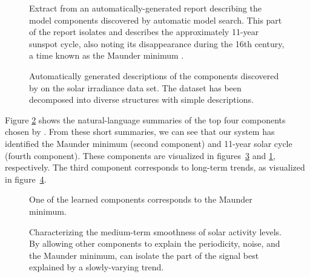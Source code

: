 \begin{figure}[h]
\centering
{}
\caption[Extract from an automatically-generated report]
{Extract from an automatically-generated report describing the model components discovered by automatic model search.  This part of the report isolates and describes the approximately 11-year sunspot cycle, also noting its disappearance during the 16th century, a time known as the Maunder minimum \citep{lean1995reconstruction}.}
\label{fig:periodic}
\end{figure}

\begin{figure}[h]
\centering
{}
\caption[Automatically-generated descriptions of the solar irradiance data set]
{Automatically generated descriptions of the components discovered by \procedurename{} on the solar irradiance data set.
The dataset has been decomposed into diverse structures with simple descriptions.}
\label{fig:exec}
\end{figure}
Figure \ref{fig:exec} shows the natural-language summaries of the top four components chosen by \procedurename{}.
From these short summaries, we can see that our system has identified the Maunder minimum (second component) and 11-year solar cycle (fourth component).
These components are visualized in figures~\ref{fig:maunder} and \ref{fig:periodic}, respectively. 
The third component corresponds to long-term trends, as visualized in figure~\ref{fig:smooth}.

\begin{figure}[ht]
\centering
{}
\caption[A learned component corresponding to the Maunder minimum]
{One of the learned components corresponds to the Maunder minimum.}
\label{fig:maunder}
\end{figure}

\begin{figure}[h!]
\centering
{}
\caption[\procedurename{} isolating the part of the signal explained by a slowly-varying trend]
{Characterizing the medium-term smoothness of solar activity levels.  By allowing other components to explain the periodicity, noise, and the Maunder minimum, \procedurename{} can isolate the part of the signal best explained by a slowly-varying trend.}
\label{fig:smooth}
\end{figure}


